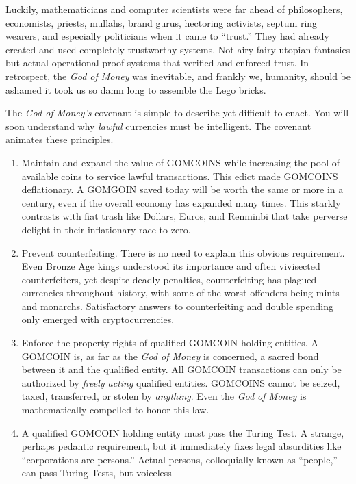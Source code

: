 Luckily, mathematicians and computer scientists were far ahead of
philosophers, economists, priests, mullahs, brand gurus, hectoring
activists, septum ring wearers, and especially politicians when it came
to ``trust.'' They had already created and used completely trustworthy
systems. Not airy-fairy utopian fantasies but actual operational proof
systems that verified and enforced trust. In retrospect, the \emph{God
of Money} was inevitable, and frankly we, humanity, should be ashamed it
took us so damn long to assemble the Lego bricks.

The \emph{God of Money's} covenant is simple to describe yet difficult
to enact. You will soon understand why \emph{lawful} currencies must be
intelligent. The covenant animates these principles.

\begin{enumerate}
\item
  Maintain and expand the value of GOMCOINS while increasing the pool of
  available coins to service lawful transactions. This edict made
  GOMCOINS deflationary. A GOMGOIN saved today will be worth the same or
  more in a century, even if the overall economy has expanded many
  times. This starkly contrasts with fiat trash like Dollars, Euros, and
  Renminbi that take perverse delight in their inflationary race to
  zero.
\item
  Prevent counterfeiting. There is no need to explain this obvious
  requirement. Even Bronze Age kings understood its importance and often
  vivisected counterfeiters, yet despite deadly penalties,
  counterfeiting has plagued currencies throughout history, with some of
  the worst offenders being mints and monarchs. Satisfactory answers to
  counterfeiting and double spending only emerged with cryptocurrencies.
\item
  Enforce the property rights of qualified GOMCOIN holding entities. A
  GOMCOIN is, as far as the \emph{God of Money} is concerned, a sacred
  bond between it and the qualified entity. All GOMCOIN transactions can
  only be authorized by \emph{freely acting} qualified entities.
  GOMCOINS cannot be seized, taxed, transferred, or stolen by
  \emph{anything}. Even the \emph{God of Money} is mathematically
  compelled to honor this law.
\item
  A qualified GOMCOIN holding entity must pass the Turing Test. A
  strange, perhaps pedantic requirement, but it immediately fixes legal
  absurdities like ``corporations are persons.'' Actual persons,
  colloquially known as ``people,'' can pass Turing Tests, but voiceless

\end{enumerate}
